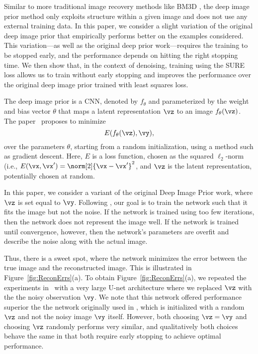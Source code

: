 \documentclass{article}
\begin{document}
Similar to more traditional image recovery methods like BM3D \cite{BM3D}, the deep image prior method only exploits structure within a given image and does not use any external training data.
In this paper, we consider a slight variation of the original deep image prior that empirically performs better on the examples considered.
This variation---as well as the original deep prior work---requires the training to be stopped early, and the performance depends on hitting the right stopping time.
We then show that, in the context of denoising, training using the SURE loss allows us to train without early stopping and improves the performance over the original deep image prior trained with least squares loss.


The deep image prior is a CNN, denoted by $f_\theta$ and parameterized by the weight and bias vector $\theta$ that maps a latent representation $\vz$ to an image $f_\theta(\vz)$. 
The paper~\cite{DeepImagePrior} proposes to minimize
\[
E(f_\theta(\vz), \vy),
\]
over the parameters $\theta$, starting from a random initialization, using a method such as gradient descent. 
Here, $E$ is a loss function, chosen as the squared $\ell_2$-norm (i.e., $E(\vx, \vx') = \norm[2]{\vx - \vx'}^2$, and $\vz$ is the latent representation, potentially chosen at random. 


In this paper, we consider a variant of the original Deep Image Prior work, where $\vz$ is set equal to $\vy$. %
Following \cite{DeepImagePrior}, our goal is to train the network such that it fits the image but not the noise. 
If the network is trained using too few iterations, then the network does not represent the image well. 
If the network is trained until convergence, however, then the network's parameters are overfit and describe the noise along with the actual image.

Thus, there is a sweet spot, where the network minimizes the error between the true image and the reconstructed image.
This is illustrated in Figure~\ref{fig:ReconErrs}(a).
To obtain Figure~\ref{fig:ReconErrs}(a), we repeated the experiments in~\cite{DeepImagePrior} with a very large U-net architecture \cite{Unet} where we replaced $\vz$ with the the noisy observation $\vy$.
We note that this network offered performance superior the the network originally used in \cite{DeepImagePrior}, which is initialized with a random $\vz$ and not the noisy image $\vy$ itself. However, both choosing $\vz=\vy$ and choosing $\vz$ randomly performs very similar, and qualitatively both choices behave the same in that both require early stopping to achieve optimal performance.
\end{document}
